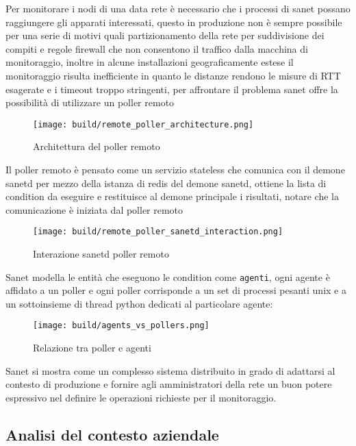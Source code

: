 Per monitorare i nodi di una data rete è necessario che i processi di sanet possano raggiungere gli apparati interessati, questo in produzione non è sempre possibile per una serie di motivi quali partizionamento della rete per suddivisione dei compiti e regole firewall che non consentono il traffico dalla macchina di monitoraggio, inoltre in alcune installazioni geograficamente estese il monitoraggio risulta inefficiente in quanto le distanze rendono le misure di RTT esagerate e i timeout troppo stringenti, per affrontare il problema sanet offre la possibilità di utilizzare un poller remoto

\begin{figure}[H]
    \centering
    \texttt{[image: build/remote\_poller\_architecture.png]}
    \caption{Architettura del poller remoto}
    \label{fig:enter-label} \end{figure}

Il poller remoto è pensato come un servizio stateless che comunica con il demone sanetd per mezzo della istanza di redis del demone sanetd, ottiene la lista di condition da eseguire e restituisce al demone principale i risultati, notare che la comunicazione è iniziata dal poller remoto


\begin{figure}[H]
    \centering
    \texttt{[image: build/remote\_poller\_sanetd\_interaction.png]}
    \caption{Interazione sanetd poller remoto}
    \label{fig:enter-label}
\end{figure}

Sanet modella le entità che eseguono le condition come \verb|agenti|, ogni agente è affidato a un poller e ogni poller corrisponde a un set di processi pesanti unix e a un sottoinsieme di thread python dedicati al particolare agente:


\begin{figure}[H]
    \centering
    \texttt{[image: build/agents\_vs\_pollers.png]}
    \caption{Relazione tra poller e agenti}
    \label{fig:enter-label}
\end{figure}

Sanet si mostra come un complesso sistema distribuito in grado di adattarsi al contesto di produzione e fornire agli amministratori della rete un buon potere espressivo nel definire le operazioni richieste per il monitoraggio.

\newpage
\subsection{Analisi del contesto aziendale}

